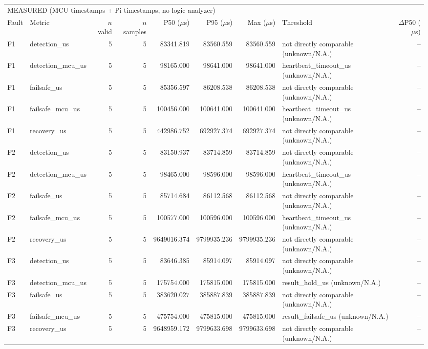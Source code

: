 \begin{tabular}{llrrrrrlr}
\multicolumn{9}{l}{MEASURED (MCU timestamps + Pi timestamps, no logic analyzer)} \\
Fault & Metric & $n$ valid & $n$ samples & P50 ($\mu$s) & P95 ($\mu$s) & Max ($\mu$s) & Threshold & $\Delta$P50 ($\mu$s) \\
\hline
F1 & detection\_us & 5 & 5 & 83341.819 & 83560.559 & 83560.559 & not directly comparable (unknown/N.A.) & -- \\
F1 & detection\_mcu\_us & 5 & 5 & 98165.000 & 98641.000 & 98641.000 & heartbeat\_timeout\_us (unknown/N.A.) & -- \\
F1 & failsafe\_us & 5 & 5 & 85356.597 & 86208.538 & 86208.538 & not directly comparable (unknown/N.A.) & -- \\
F1 & failsafe\_mcu\_us & 5 & 5 & 100456.000 & 100641.000 & 100641.000 & heartbeat\_timeout\_us (unknown/N.A.) & -- \\
F1 & recovery\_us & 5 & 5 & 442986.752 & 692927.374 & 692927.374 & not directly comparable (unknown/N.A.) & -- \\
F2 & detection\_us & 5 & 5 & 83150.937 & 83714.859 & 83714.859 & not directly comparable (unknown/N.A.) & -- \\
F2 & detection\_mcu\_us & 5 & 5 & 98465.000 & 98596.000 & 98596.000 & heartbeat\_timeout\_us (unknown/N.A.) & -- \\
F2 & failsafe\_us & 5 & 5 & 85714.684 & 86112.568 & 86112.568 & not directly comparable (unknown/N.A.) & -- \\
F2 & failsafe\_mcu\_us & 5 & 5 & 100577.000 & 100596.000 & 100596.000 & heartbeat\_timeout\_us (unknown/N.A.) & -- \\
F2 & recovery\_us & 5 & 5 & 9649016.374 & 9799935.236 & 9799935.236 & not directly comparable (unknown/N.A.) & -- \\
F3 & detection\_us & 5 & 5 & 83646.385 & 85914.097 & 85914.097 & not directly comparable (unknown/N.A.) & -- \\
F3 & detection\_mcu\_us & 5 & 5 & 175754.000 & 175815.000 & 175815.000 & result\_hold\_us (unknown/N.A.) & -- \\
F3 & failsafe\_us & 5 & 5 & 383620.027 & 385887.839 & 385887.839 & not directly comparable (unknown/N.A.) & -- \\
F3 & failsafe\_mcu\_us & 5 & 5 & 475754.000 & 475815.000 & 475815.000 & result\_failsafe\_us (unknown/N.A.) & -- \\
F3 & recovery\_us & 5 & 5 & 9648959.172 & 9799633.698 & 9799633.698 & not directly comparable (unknown/N.A.) & -- \\

\end{tabular}
